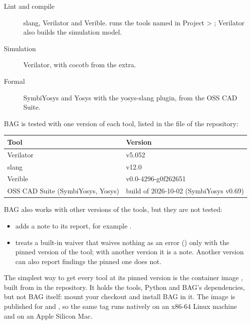 \begin{description}
\item[Lint and compile] slang, Verilator and Verible.  runs the tools
  named in Project > ; Verilator also builds the simulation model.
\item[Simulation] Verilator, with cocotb from the  extra.
\item[Formal] SymbiYosys and Yosys with the yosys-slang plugin, from the OSS CAD Suite.
\end{description}

BAG is tested with one version of each tool, listed in the file  of
the repository:

\begin{center}
\begin{tabular}{ll}
\toprule
Tool & Version \\
\midrule
Verilator & v5.052 \\
slang & v12.0 \\
Verible & v0.0-4296-g0f262651 \\
OSS CAD Suite (SymbiYosys, Yosys) & build of 2026-10-02 (SymbiYosys v0.69) \\
\bottomrule
\end{tabular}
\end{center}

BAG also works with other versions of the tools, but they are not tested:

\begin{itemize}
\item {} adds a note to its report, for example
  .
\item {} treats a built-in waiver that waives nothing as an error
  () only with the pinned version of the tool; with another
  version it is a note. Another version can also report findings the pinned one does
  not.
\end{itemize}

The simplest way to get every tool at its pinned version is the container image
, built from  in the
repository. It holds the tools, Python and BAG's dependencies, but not BAG itself:
mount your checkout and install BAG in it. The image is published for
 and , so the same tag runs natively on an
x86-64 Linux machine and on an Apple Silicon Mac.

